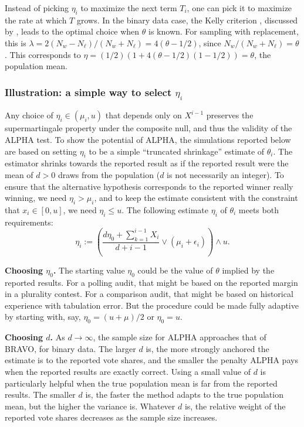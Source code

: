 \documentclass[aoas]{imsart}
\begin{document}
Instead of picking $\eta_i$ to maximize the next term $T_i$, one can pick it to maximize the rate at which $T$ grows.
In the binary data case, the Kelly criterion \citep{kelly56}, discussed by \citet{waudby-smithRamdas21}, leads to the
optimal choice when $\theta$ is known.
For sampling with replacement, this is $\lambda = 2(N_w-N_\ell)/(N_w+N_\ell) = 4(\theta-1/2)$, since $N_w/(N_w+N_\ell) = \theta$.
This corresponds to $\eta =  (1/2) \left ( 1 + 4(\theta-1/2)  (1-1/2) \right ) = \theta$, the population mean. 

\subsubsection{Illustration: a simple way to select $\eta_i$}
Any choice of $\eta_i \in (\mu_i, u)$ that depends only on $X^{i-1}$ preserves the supermartingale property
under the composite null, and thus
the validity of the ALPHA test.
To show the potential of ALPHA, the simulations reported below are based on setting $\eta_i$ to be a simple 
``truncated shrinkage'' estimate of $\theta_i$.
The estimator shrinks towards the reported result as if the reported
result were the mean of 
$d>0$ draws from the population ($d$ is not necessarily an integer). 
To ensure that the alternative hypothesis corresponds to the reported
winner really winning, we need $\eta_i > \mu_i$, and to keep the estimate consistent with the
constraint that $x_i \in [0, u]$, we need $\eta_i \le u$.
The following estimate $\eta_i$ of $\theta_i$ meets both requirements:
\begin{equation} \label{eq:etaDef}
\eta_i :=  \left ( \frac{d\eta_0 + \sum_{k=1}^{i-1}X_i }{d+i-1} \vee (\mu_i+\epsilon_i ) \right )
\wedge u.
\end{equation}

{\bf Choosing $\eta_0$.}
The starting value $\eta_0$ could be the value of $\theta$ implied by the reported results.
For a polling audit, that might be based on the reported margin in a plurality contest.
For a comparison audit, that might be based on historical experience with tabulation error.
But the procedure could be made fully adaptive by starting with,
say, $\eta_0 = (u+\mu)/2$ or $\eta_0 = u$.

{\bf Choosing $d$.}
As $d \rightarrow \infty$, the sample size for ALPHA approaches that of BRAVO, for binary data.
The larger $d$ is, the more strongly anchored the estimate is to the reported vote shares, and
the smaller the penalty ALPHA pays when the reported results are exactly correct.
Using a small value of $d$ is particularly helpful when the true population mean is far from the reported results.
The smaller $d$ is, the faster the method adapts to the true population mean, but the higher the variance is.
Whatever $d$ is, the relative weight of the reported vote shares decreases as the sample size increases.
\end{document}

